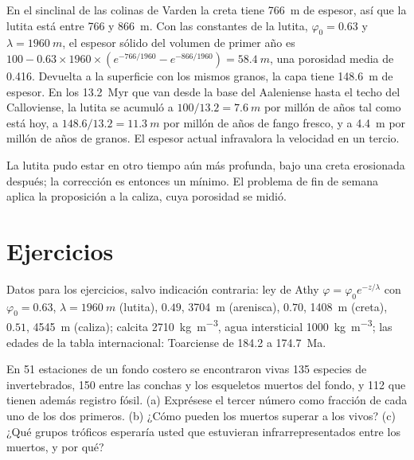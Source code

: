 \begin{example}\label{ex:b2:palaeoenvironments:shale}
En el sinclinal de las colinas de Varden la creta tiene \qty{766}{m} de espesor, así que la lutita está entre
766 y \qty{866}{m}. Con las constantes de la lutita, $\varphi_0 = 0.63$ y $\lambda =
\qty{1960}{m}$, el espesor sólido del volumen de primer año es $100 - 0.63 \times 1960 \times
(e^{-766/1960} - e^{-866/1960}) = \qty{58.4}{m}$, una porosidad media de 0.416. Devuelta a la
superficie con los mismos granos, la capa tiene \qty{148.6}{m} de espesor. En los \qty{13.2}{Myr} que van desde
la base del Aaleniense hasta el techo del Calloviense, la lutita se acumuló a $100/13.2 =
\qty{7.6}{m}$ por millón de años tal como está hoy, a $148.6/13.2 = \qty{11.3}{m}$ por millón de
años de fango fresco, y a \qty{4.4}{m} por millón de años de granos. El espesor actual
infravalora la velocidad en un tercio.
\end{example}

La lutita pudo estar en otro tiempo aún más profunda, bajo una creta erosionada después; la corrección es entonces un
mínimo. El problema de fin de semana aplica la proposición a la caliza, cuya porosidad se
midió.

\section*{Ejercicios}\label{sec:b2:palaeoenvironments:exercises}

Datos para los ejercicios, salvo indicación contraria: ley de Athy $\varphi = \varphi_0 e^{-z/\lambda}$
con $\varphi_0 = 0.63$, $\lambda = \qty{1960}{m}$ (lutita), $0.49$, \qty{3704}{m} (arenisca),
$0.70$, \qty{1408}{m} (creta), $0.51$, \qty{4545}{m} (caliza); calcita \qty{2710}{kg.m^{-3}},
agua intersticial \qty{1000}{kg.m^{-3}}; las edades de la tabla internacional: Toarciense de 184.2 a
\qty{174.7}{Ma}.

\begin{exercise}[$\star$]\label{exo:b2:palaeoenvironments:1}
En 51 estaciones de un fondo costero se encontraron vivas 135 especies de invertebrados, 150 entre las conchas
y los esqueletos muertos del fondo, y 112 que tienen además registro fósil. (a) Exprésese el tercer
número como fracción de cada uno de los dos primeros. (b) ¿Cómo pueden los muertos superar a los vivos? (c)
¿Qué grupos tróficos esperaría usted que estuvieran infrarrepresentados entre los muertos, y por qué?
\end{exercise}

